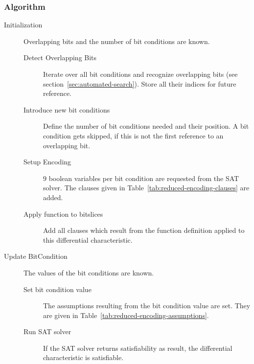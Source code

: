 \subsubsection{Algorithm}
\label{sec:reduced-encoding-algorithm}
%
\begin{description}
  \item[Initialization] Overlapping bits and the number of bit conditions are known.
    \begin{description}
      \item[Detect Overlapping Bits] Iterate over all bit conditions and recognize overlapping bits (see section~\ref{sec:automated-search}). Store all their indices for future reference.
      \item[Introduce new bit conditions] Define the number of bit conditions needed and their position. A bit condition gets skipped, if this is not the first reference to an overlapping bit.
      \item[Setup Encoding] $9$ boolean variables per bit condition are requested from the SAT solver. The clauses given in Table~\ref{tab:reduced-encoding-clauses} are added.
      \item[Apply function to bitslices] Add all clauses which result from the function definition applied to this differential characteristic.
    \end{description}
  \item[Update BitCondition] The values of the bit conditions are known.
    \begin{description}
      \item[Set bit condition value] The assumptions resulting from the bit condition value are set. They are given in Table~\ref{tab:reduced-encoding-assumptions}.
      \item[Run SAT solver] If the SAT solver returns satisfiability as result, the differential characteristic is satisfiable.
    \end{description}
\end{description}

